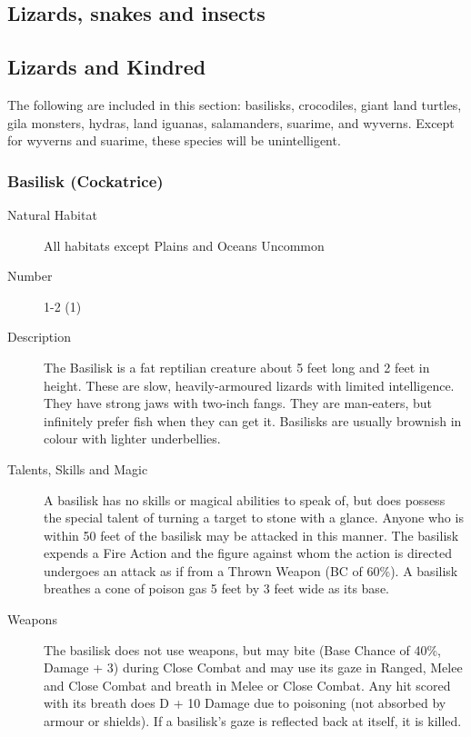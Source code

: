 \begin{multicols*}{2}

\setlength\columnseprule{0.2mm}

\section{Lizards, snakes and insects}

\subsection{Lizards and Kindred}
The following are included in this section: basilisks, crocodiles,
giant land turtles, gila monsters, hydras, land iguanas, salamanders,
suarime, and wyverns.  Except for wyverns and suarime, these species
will be unintelligent.

\subsubsection{Basilisk (Cockatrice)}

\begin{description}
\item[Natural Habitat] All habitats except Plains and Oceans Uncommon

\item[Number] 1-2 (1)

\item[Description] The Basilisk is a fat reptilian creature about 5 feet
long and 2 feet in height. These are slow, heavily-armoured lizards
with limited intelligence.  They have strong jaws with two-inch
fangs.  They are man-eaters, but infinitely prefer fish when they can
get it.  Basilisks are usually brownish in colour with lighter
underbellies.

\item[Talents, Skills and Magic] A basilisk has no skills or magical abilities to speak of,
but does possess the special talent of turning a target to stone with
a glance.  Anyone who is within 50 feet of the basilisk may be
attacked in this manner.  The basilisk expends a Fire Action and the
figure against whom the action is directed undergoes an attack as if
from a Thrown Weapon (BC of 60\%). A basilisk breathes a cone of
poison gas 5 feet by 3 feet wide as its base.

\item[Weapons] The basilisk does not use weapons, but may bite (Base Chance
of 40\%, Damage + 3) during Close Combat and may use its gaze in
Ranged, Melee and Close Combat and breath in Melee or Close Combat.
Any hit scored with its breath does D + 10 Damage due to poisoning
(not absorbed by armour or shields). If a basilisk's gaze is reflected
back at itself, it is killed.


\end{description}
\end{multicols*}

